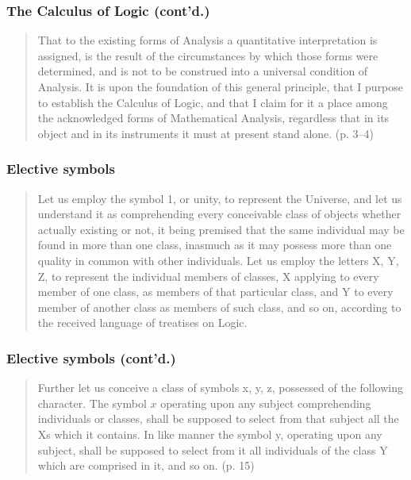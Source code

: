 \documentclass[compress,12pt]{beamer}
\begin{document}
\begin{frame}
    \frametitle{The Calculus of Logic (cont'd.)}
    \begin{quote}
        That to the existing forms of Analysis a quantitative interpretation is assigned, is the result of the circumstances by which those forms were determined, and is not to
        be construed into a universal condition of Analysis. It is upon
        the foundation of this general principle, that I purpose to
        establish the Calculus of Logic, and that I claim for it a place
        among the acknowledged forms of Mathematical Analysis, regardless that in its object and in its instruments it must at
        present stand alone. (p. 3--4)
    \end{quote}
\end{frame}

\begin{frame}
    \frametitle{Elective symbols}
    \begin{quote}
        Let us employ the symbol 1, or unity, to represent the
        Universe, and let us understand it as comprehending every
        conceivable class of objects whether actually existing or not,
        it being premised that the same individual may be found in
        more than one class, inasmuch as it may possess more than one
        quality in common with other individuals. Let us employ the
        letters X, Y, Z, to represent the individual members of classes,
        X applying to every member of one class, as members of that
        particular class, and Y to every member of another class as
        members of such class, and so on, according to the received language of treatises on Logic.
    \end{quote}
\end{frame}

\begin{frame}
    \frametitle{Elective symbols (cont'd.)}
    \begin{quote}
        Further let us conceive a class of symbols x, y, z, possessed
        of the following character.
        The symbol $x$ operating upon any subject comprehending
        individuals or classes, shall be supposed to select from that
        subject all the Xs which it contains. In like manner the symbol
        y, operating upon any subject, shall be supposed to select from
        it all individuals of the class Y which are comprised in it, and
        so on. (p. 15)
    \end{quote}
\end{frame}
\end{document}
